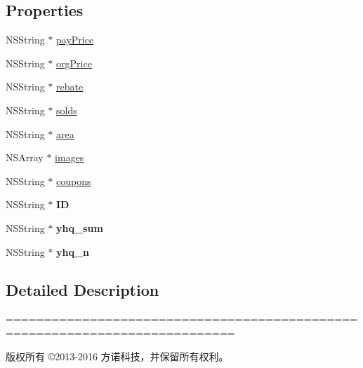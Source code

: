 \subsection*{Properties}
\begin{DoxyCompactItemize}
\item 
N\+S\+String $\ast$ \mbox{\hyperlink{interface_f_n_product_detail_model_adf7da8f35ec815988223bd37476b60bf}{pay\+Price}}
\item 
N\+S\+String $\ast$ \mbox{\hyperlink{interface_f_n_product_detail_model_a0c0279e21765eaf42ac60bc095e7944a}{org\+Price}}
\item 
N\+S\+String $\ast$ \mbox{\hyperlink{interface_f_n_product_detail_model_a73a844f78aabc59744706c44313194ad}{rebate}}
\item 
N\+S\+String $\ast$ \mbox{\hyperlink{interface_f_n_product_detail_model_a9289fe708c8135e224958808daa97fc2}{solds}}
\item 
N\+S\+String $\ast$ \mbox{\hyperlink{interface_f_n_product_detail_model_a13d84b00e26d813913bb08f6e44a6a2b}{area}}
\item 
N\+S\+Array $\ast$ \mbox{\hyperlink{interface_f_n_product_detail_model_a55738e38005b640be3be4a9ef5d27e7c}{images}}
\item 
N\+S\+String $\ast$ \mbox{\hyperlink{interface_f_n_product_detail_model_aca81017a4bf7bb37407822b3d044204f}{coupons}}
\item 
\mbox{\label{interface_f_n_product_detail_model_a688229978527e6c6b346cb7e4124d473}} 
N\+S\+String $\ast$ {\bfseries ID}
\item 
\mbox{\label{interface_f_n_product_detail_model_ad2acae15efa425a58b41936c4b8b0878}} 
N\+S\+String $\ast$ {\bfseries yhq\+\_\+sum}
\item 
\mbox{\label{interface_f_n_product_detail_model_a101d2aef17a03a1ea4a0ead9401b2a84}} 
N\+S\+String $\ast$ {\bfseries yhq\+\_\+n}
\end{DoxyCompactItemize}


\subsection{Detailed Description}
============================================================================

版权所有 ©2013-\/2016 方诺科技，并保留所有权利。

